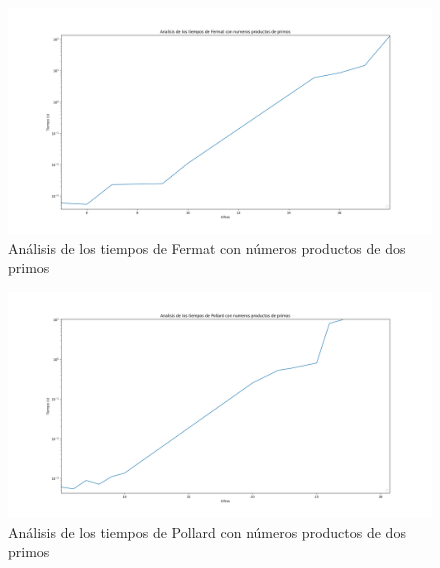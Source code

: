 \documentclass{article}
\begin{document}
    \begin{figure}[ht!]
        \centering
        \includegraphics[scale=0.3]{Figure_4}
        \caption{Análisis de los tiempos de Fermat con números productos de dos primos}
        \label{fig:Figure_4}
    \end{figure}

    \begin{figure}[ht!]
        \centering
        \includegraphics[scale=0.3]{Figure_6}
        \caption{Análisis de los tiempos de Pollard con números productos de dos primos}
        \label{fig:Figure_6}
    \end{figure}
 \newpage
 
\end{document}
